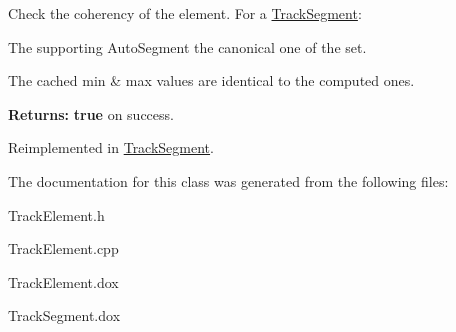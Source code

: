 Check the coherency of the element. For a \hyperlink{classKite_1_1TrackSegment}{Track\+Segment}\+:
\begin{DoxyItemize}
\item The supporting Auto\+Segment the canonical one of the set.
\item The cached {\ttfamily min} \& {\ttfamily max} values are identical to the computed ones.
\end{DoxyItemize}

{\bfseries Returns\+:} {\bfseries true} on success. 

Reimplemented in \hyperlink{classKite_1_1TrackSegment_ad79f4c6ea0fe1135b8264a29af085909}{Track\+Segment}.



The documentation for this class was generated from the following files\+:\begin{DoxyCompactItemize}
\item 
Track\+Element.\+h\item 
Track\+Element.\+cpp\item 
Track\+Element.\+dox\item 
Track\+Segment.\+dox\end{DoxyCompactItemize}
